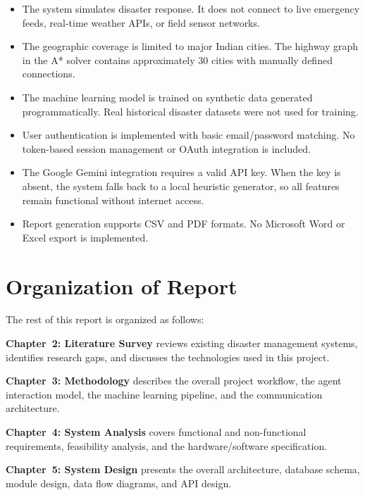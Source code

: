 \begin{itemize}[leftmargin=*]
    \item The system simulates disaster response. It does not connect to live emergency feeds, real-time weather APIs, or field sensor networks.

    \item The geographic coverage is limited to major Indian cities. The highway graph in the A* solver contains approximately 30 cities with manually defined connections.

    \item The machine learning model is trained on synthetic data generated programmatically. Real historical disaster datasets were not used for training.

    \item User authentication is implemented with basic email/password matching. No token-based session management or OAuth integration is included.

    \item The Google Gemini integration requires a valid API key. When the key is absent, the system falls back to a local heuristic generator, so all features remain functional without internet access.

    \item Report generation supports CSV and PDF formats. No Microsoft Word or Excel export is implemented.
\end{itemize}

\section{Organization of Report}
\label{sec:organization}

The rest of this report is organized as follows:

\textbf{Chapter~2: Literature Survey} reviews existing disaster management systems, identifies research gaps, and discusses the technologies used in this project.

\textbf{Chapter~3: Methodology} describes the overall project workflow, the agent interaction model, the machine learning pipeline, and the communication architecture.

\textbf{Chapter~4: System Analysis} covers functional and non-functional requirements, feasibility analysis, and the hardware/software specification.

\textbf{Chapter~5: System Design} presents the overall architecture, database schema, module design, data flow diagrams, and API design.

